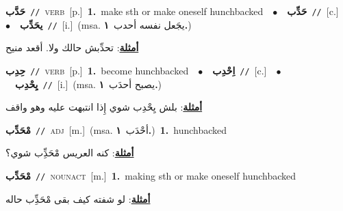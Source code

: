 \documentclass[10pt,a4paper,twoside]{article} %
\begin{document}
\begin{multicols}{2}
{\setlength\topsep{0pt}\textbf{\foreignlanguage{arabic}{حَدَّب}}\ {\color{gray}\texttt{//}\color{black}}\ \textsc{verb}\ [p.]\ \textbf{1.}~make sth or make oneself hunchbacked\ \ $\bullet$\ \ \setlength\topsep{0pt}\textbf{\foreignlanguage{arabic}{حَدِّب}}\ {\color{gray}\texttt{//}\color{black}}\ [c.]\ \ $\bullet$\ \ \setlength\topsep{0pt}\textbf{\foreignlanguage{arabic}{يحَدِّب}}\ {\color{gray}\texttt{//}\color{black}}\ [i.]\ \color{gray}(msa. \foreignlanguage{arabic}{يجَعل نفسه أحدب}~\foreignlanguage{arabic}{\textbf{١.}})\color{black}\  \begin{flushright}\color{gray}\foreignlanguage{arabic}{\textbf{\underline{\foreignlanguage{arabic}{أمثلة}}}: تحدِّبش حالك ولا. أقعد منيح}\end{flushright}\color{black}} \vspace{2mm}

{\setlength\topsep{0pt}\textbf{\foreignlanguage{arabic}{حِدِب}}\ {\color{gray}\texttt{//}\color{black}}\ \textsc{verb}\ [p.]\ \textbf{1.}~become hunchbacked\ \ $\bullet$\ \ \setlength\topsep{0pt}\textbf{\foreignlanguage{arabic}{اِحْدِب}}\ {\color{gray}\texttt{//}\color{black}}\ [c.]\ \ $\bullet$\ \ \setlength\topsep{0pt}\textbf{\foreignlanguage{arabic}{يِحْدِب}}\ {\color{gray}\texttt{//}\color{black}}\ [i.]\ \color{gray}(msa. \foreignlanguage{arabic}{يصبح أحدَب}~\foreignlanguage{arabic}{\textbf{١.}})\color{black}\  \begin{flushright}\color{gray}\foreignlanguage{arabic}{\textbf{\underline{\foreignlanguage{arabic}{أمثلة}}}: بلش يِحْدِب شوي إِذا انتبهت عليه وهو واقف}\end{flushright}\color{black}} \vspace{2mm}

{\setlength\topsep{0pt}\textbf{\foreignlanguage{arabic}{مْحَدِّب}}\ {\color{gray}\texttt{//}\color{black}}\ \textsc{adj}\ [m.]\ \color{gray}(msa. \foreignlanguage{arabic}{أحْدَب}~\foreignlanguage{arabic}{\textbf{١.}})\color{black}\ \textbf{1.}~hunchbacked\  \begin{flushright}\color{gray}\foreignlanguage{arabic}{\textbf{\underline{\foreignlanguage{arabic}{أمثلة}}}: كنه العريس مْحَدِِّب شوي؟}\end{flushright}\color{black}} \vspace{2mm}

{\setlength\topsep{0pt}\textbf{\foreignlanguage{arabic}{مْحَدِّب}}\ {\color{gray}\texttt{//}\color{black}}\ \textsc{noun\textunderscore act}\ [m.]\ \textbf{1.}~making sth or make oneself hunchbacked\  \begin{flushright}\color{gray}\foreignlanguage{arabic}{\textbf{\underline{\foreignlanguage{arabic}{أمثلة}}}: لو شفته كيف بقى مْحَدِِّب حاله}\end{flushright}\color{black}} \vspace{2mm}


\end{multicols}
\end{document}
